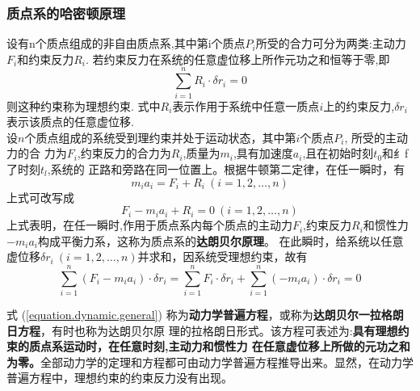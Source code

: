 \documentclass{book}
\begin{document}
\subsubsection{质点系的哈密顿原理}
设有n个质点组成的非自由质点系,其中第i个质点$P_i$所受的合力可分为两类:主动力$F_i$和约束反力$R_i$. 若约束反力在系统的任意虚位移上所作元功之和恒等于零,即
\begin{equation}
\sum_{i=1}^n R_i \cdot \delta r_i =0
\end{equation}
则这种约束称为理想约束. 式中$R_i$表示作用于系统中任意一质点$i$上的约束反力,$\delta r_i$表示该质点的任意虚位移.
\\
设$n$个质点组成的系统受到理约束并处于运动状态，其中第$i$个质点$P_i$, 所受的主动力的合 力为$F_i$,约束反力的合力为$R_i$,质量为$m_i$,具有加速度$a_i$,且在初始时刻$t_0$和纟f 了时刻$t_l$,系统的 正路和旁路在同一位置上。根据牛顿第二定律，在任一瞬时，有
\begin{equation}
 m_i a_i = F_i + R_i  ~(i=1,2,\ldots,n)
\end{equation}
上式可改写成
\begin{equation}
   F_i- m_i a_i + R_i =0 ~(i=1,2,\ldots,n)
\end{equation}
上式表明，在任一瞬时,作用于质点系内每个质点的主动力$F_i$,约束反力$R_i$和惯性力$-m_ia_i$构成平衡力系，这称为质点系的\textbf{达朗贝尔原理}。
在此瞬时，给系统以任意虚位移$\delta r_i ~ (i=1,2,\ldots,n)$并求和，因系统受理想约束，故有
\begin{equation}
 \sum_{i=1}^n(F_i - m_i a_i)\cdot \delta r_i =\sum_{i=1}^nF_i \cdot \delta r_i +\sum_{i=1}^n(- m_i a_i)\cdot \delta r_i=0
 \label{equation.dynamic.general}
\end{equation}

式 (\ref{equation.dynamic.general})
称为\textbf{动力学普遍方程}，或称为\textbf{达朗贝尔一拉格朗日方程}，有时也称为达朗贝尔原 理的拉格朗日形式。该方程可表述为:\textbf{具有理想约束的质点系运动时，在任意时刻,主动力和惯性力 在任意虚位移上所做的元功之和为零。}全部动力学的定理和方程都可由动力学普遍方程推导出来。显然，在动力学普遍方程中，理想约束的约束反力没有出现。
\end{document}
